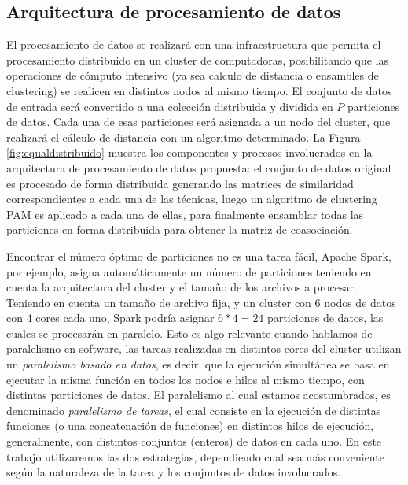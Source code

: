 \subsection{Arquitectura de procesamiento de datos}

El procesamiento de datos se realizará con una infraestructura que permita el procesamiento distribuido en un cluster de computadoras, posibilitando que las operaciones de cómputo intensivo (ya sea calculo de distancia o ensambles de clustering) se realicen en distintos nodos al mismo tiempo. El conjunto de datos de entrada será convertido a una colección distribuida y dividida en \(P\) particiones de datos. Cada una de esas particiones será asignada a un nodo del cluster, que realizará el cálculo de distancia con un algoritmo determinado. La Figura \ref{fig:equaldistribuido} muestra los componentes y procesos involucrados en la arquitectura de procesamiento de datos propuesta: el conjunto de datos original es procesado de forma distribuida generando las matrices de similaridad correspondientes a cada una de las técnicas, luego un algoritmo de clustering PAM es aplicado a cada una de ellas, para finalmente ensamblar todas las particiones en forma distribuida para obtener la matriz de coasociación.

\bigskip Encontrar el número óptimo de particiones no es una tarea fácil, Apache Spark, por ejemplo, asigna automáticamente un número de particiones teniendo en cuenta la arquitectura del cluster y el tamaño de los archivos a procesar. Teniendo en cuenta un tamaño de archivo fija, y un cluster con 6 nodos de datos con 4 cores cada uno, Spark podría asignar \(6*4=24\) particiones de datos, las cuales se procesarán en paralelo. Esto es algo relevante cuando hablamos de paralelismo en software, las tareas realizadas en distintos cores del cluster utilizan un \textit{paralelismo basado en datos}, es decir, que la ejecución simultánea se basa en ejecutar la misma función en todos los nodos e hilos al mismo tiempo, con distintas particiones de datos. El paralelismo al cual estamos acostumbrados, es denominado \textit{paralelismo de tareas}, el cual consiste en la ejecución de distintas funciones (o una concatenación de funciones) en distintos hilos de ejecución, generalmente, con distintos conjuntos (enteros) de datos en cada uno. En este trabajo utilizaremos las dos estrategias, dependiendo cual sea más conveniente según la naturaleza de la tarea y los conjuntos de datos involucrados.

